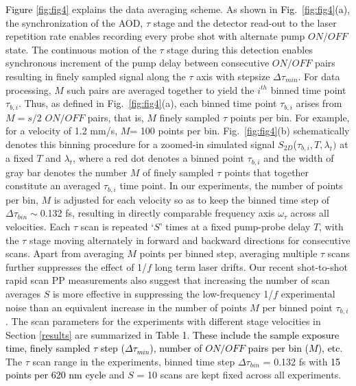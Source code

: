 \documentclass[%
aip,
amsmath,amssymb,
preprint,%
]{revtex4-2}
\newcommand*{\vt}[1]{\textcolor{black}{ #1}}
\newcommand*{\si}[1]{\textcolor{black}{ #1}}
\begin{document}
\si{Figure \ref{fig:fig4}} explains the data averaging scheme. As shown in \si{Fig.~\ref{fig:fig4}(a)}, the synchronization of the AOD, $\tau$ stage and the detector read-out to the laser repetition rate enables recording every probe shot with alternate pump $ON/OFF$ state. The continuous motion of the $\tau$ stage during this detection enables synchronous increment of the pump delay between consecutive $ON/OFF$ pairs resulting in finely sampled signal along the $\tau$ axis with stepsize $\Delta\tau_{min}$. For data processing, $M$ such pairs are averaged together to yield the $i^{th}$ binned time point $\tau_{b,i}$. Thus, as defined in Fig.~\ref{fig:fig4}(a), each binned time point $\tau_{b,i}$ arises from $M = s/2$ $ON/OFF$ pairs, that is, $M$ finely sampled $\tau$ points per bin. For example, for a velocity of 1.2 mm/s, $M $= 100 points per bin. Fig.~\ref{fig:fig4}(b) schematically denotes this binning procedure for a zoomed-in simulated signal $S_{2D}$($\tau_{b,i}, T, \lambda_t)$ at a fixed $T$ and $\lambda_t$, where a red dot denotes a binned point $\tau_{b,i}$ and the width of gray bar denotes the number $M$ of finely sampled $\tau$ points that together constitute an averaged $\tau_{b,i}$ time point. In our experiments, the number of points per bin, $M$ is adjusted for each velocity so as to keep the binned time step of $\Delta\tau_{bin}\sim$0.132 fs, resulting in directly comparable frequency axis $\omega_{\tau}$ across all velocities. Each $\tau$ scan is repeated `$S$' times at a fixed pump-probe delay $T$, with the $\tau$ stage moving alternately in forward and backward directions for consecutive scans. Apart from averaging $M$ points per binned step, averaging multiple $\tau$ scans further suppresses the effect of 1/$f$ long term laser drifts. Our recent shot-to-shot rapid scan PP\cite{Bhat2023} measurements also suggest that increasing the number of scan averages $S$ is more effective in suppressing the low-frequency 1/$f$ experimental noise than an equivalent increase in the number of points $M$ per binned point $\tau_{b,i}$. The scan parameters for the experiments with different stage velocities in Section \ref{results} are summarized in \si{Table 1}. \vt{These include the sample exposure time, finely sampled $\tau$ step ($\Delta\tau_{min}$), number of $ON/OFF$ pairs per bin ($M$), etc}. The $\tau$ scan range in the experiments, binned time step $\Delta\tau_{bin}$ = 0.132 fs with \vt{15 points per 620 nm cycle} and $S$ = 10 scans are kept fixed across all experiments. \\
\end{document}
